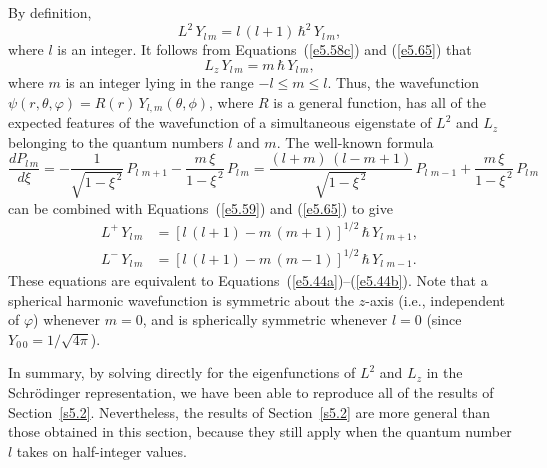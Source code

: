 By definition,
\begin{equation}\label{e5.69}
L^2 \,Y_{l\,m} = l\,(l+1)\,\hbar^2\,Y_{l\,m},
\end{equation}
where $l$ is an integer.
It follows from Equations~(\ref{e5.58c}) and (\ref{e5.65}) that
\begin{equation}
L_z \,Y_{l\,m} = m\,\hbar\,Y_{l\,m},
\end{equation}
where $m$ is an integer lying in the range $-l\leq m \leq l$. Thus, the
wavefunction $\psi(r, \theta, \varphi) = R(r) \,Y_{l,m}(\theta, \phi)$, where
$R$ is a general function,  has
all of the expected features of the wavefunction 
of a simultaneous eigenstate of $L^2$ and $L_z$
belonging to the quantum numbers $l$ and $m$. The well-known formula
\begin{equation}\label{e4.94v}
\frac{d P_{l\,m}}{d\xi} = -\frac{1}{\sqrt{1-\xi^{\,2}}}\,P_{l\,\,m+1}
- \frac{m\,\xi}{1-\xi^{\,2}}\, P_{l\,m} 
=  \frac{(l+m)\,(l-m+1)}{\sqrt{1-\xi^{\,2}}}\,P_{l\,\,m-1} + \frac{m\,\xi}
{1-\xi^{\,2}}\, P_{l\,m}
\end{equation}
can be combined with Equations~(\ref{e5.59}) and (\ref{e5.65}) to give
\begin{align}\label{e4.95v}
L^+ \,Y_{l\,m} &= [l\,(l+1)- m\,(m+1)]^{1/2}\,\hbar\,Y_{l\,\,m+1},\\[0.5ex]
L^- \,Y_{l\,m} &= [l\,(l+1) - m \,(m-1)]^{1/2} \,\hbar \,Y_{l\,\,m-1}.\label{e4.96v}
\end{align}
These equations are equivalent to Equations~(\ref{e5.44a})--(\ref{e5.44b}). Note that a spherical
harmonic  wavefunction
is symmetric about the $z$-axis ({\rm i.e.}, independent of $\varphi$) whenever
$m=0$, and is spherically symmetric whenever $l=0$ (since
$Y_{0\,0} = 1/\sqrt{4\pi}$). 

In summary, by solving directly
for the 
eigenfunctions of $L^2$ and $L_z$  in the Schr\"{o}d\-inger representation, we have been able to reproduce
all of the results of Section~\ref{s5.2}. Nevertheless, the results of Section~\ref{s5.2}
are more general than those obtained in this section, because they still apply
when the quantum number $l$ takes on half-integer values. 

